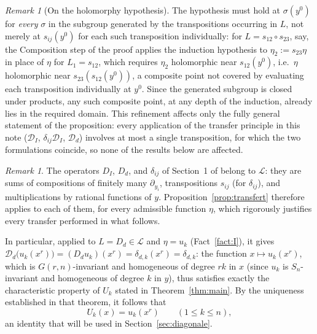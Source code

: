 \documentclass[11pt]{article}
\theoremstyle{remark}
\newtheorem{remark}[theorem]{Remark}
\begin{document}
\begin{remark}[On the holomorphy hypothesis]\label{rem:holomorphy}
The hypothesis must hold at $\sigma(y^0)$ for \emph{every} $\sigma$ in the subgroup generated by the transpositions occurring in $L$, not merely at $s_{ij}(y^0)$ for each such transposition individually: for $L=s_{12}\circ s_{23}$, say, the Composition step of the proof applies the induction hypothesis to $\eta_2:=s_{23}\eta$ in place of $\eta$ for $L_1=s_{12}$, which requires $\eta_2$ holomorphic near $s_{12}(y^0)$, i.e.\ $\eta$ holomorphic near $s_{23}(s_{12}(y^0))$, a composite point not covered by evaluating each transposition individually at $y^0$. Since the generated subgroup is closed under products, any such composite point, at any depth of the induction, already lies in the required domain. This refinement affects only the fully general statement of the proposition: every application of the transfer principle in this note ($\mathcal D_I$, $\delta_{ij}\mathcal D_I$, $\mathcal D_d$) involves at most a single transposition, for which the two formulations coincide, so none of the results below are affected.
\end{remark}

\begin{remark}\label{rem:transfertusage}
The operators $D_I$, $D_d$, and $\delta_{ij}$ of Section~1 of \cite{Ze} belong to $\mathcal L$: they are sums of compositions of finitely many $\partial_{y_i}$, transpositions $s_{ij}$ (for $\delta_{ij}$), and multiplications by rational functions of $y$. Proposition~\ref{prop:transfert} therefore applies to each of them, for every admissible function $\eta$, which rigorously justifies every transfer performed in what follows.

In particular, applied to $L=D_d\in\mathcal L$ and $\eta=u_k$ (Fact~\ref{fact:I}), it gives $\mathcal D_d\big(u_k(x^r)\big) = (D_du_k)(x^r) = \delta_{d,k}(x^r)=\delta_{d,k}$: the function $x\mapsto u_k(x^r)$, which is $G(r,n)$-invariant and homogeneous of degree $rk$ in $x$ (since $u_k$ is $S_n$-invariant and homogeneous of degree $k$ in $y$), thus satisfies exactly the characteristic property of $U_k$ stated in Theorem~\ref{thm:main}. By the uniqueness established in that theorem, it follows that
\[
U_k(x) = u_k(x^r) \qquad (1\le k\le n),
\]
an identity that will be used in Section~\ref{sec:diagonale}.
\end{remark}
\end{document}
